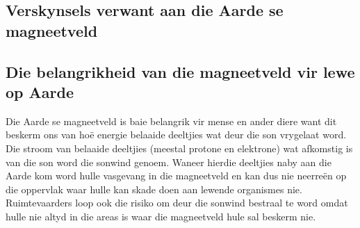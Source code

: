 
	



\subsection{Verskynsels verwant aan die Aarde se magneetveld}
            \nopagebreak
\label{m37830*fs-id7505799}

\subsection{Die belangrikheid van die magneetveld vir lewe op Aarde}
            \nopagebreak

Die Aarde se magneetveld is baie belangrik vir mense en ander diere want dit beskerm ons van ho\"e energie belaaide deeltjies wat deur die son vrygelaat word. Die stroom van belaaide deeltjies (meestal protone en elektrone) wat afkomstig is van die son word die sonwind genoem. Waneer hierdie deeltjies naby aan die Aarde kom word hulle vasgevang in die magneetveld en kan dus nie neerre\"en op die oppervlak waar hulle kan skade doen aan lewende organismes nie. Ruimtevaarders loop ook die risiko om deur die sonwind bestraal te word omdat hulle nie altyd in die areas is waar die magneetveld hule sal beskerm nie.\par

